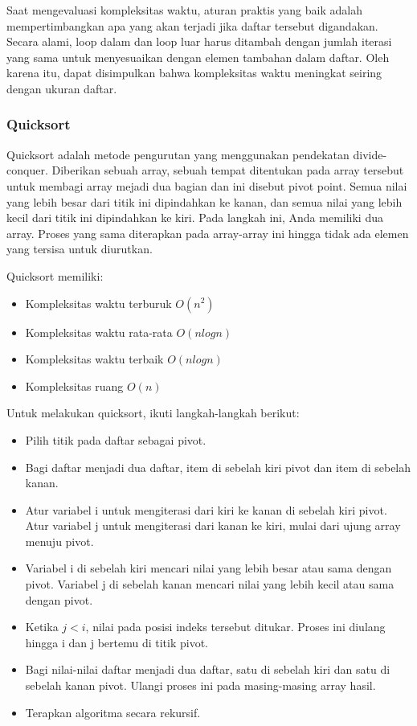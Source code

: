 \documentclass{article}
\begin{document}
Saat mengevaluasi kompleksitas waktu, aturan praktis yang baik adalah mempertimbangkan apa yang akan terjadi jika daftar tersebut digandakan. Secara alami, loop dalam dan loop luar harus ditambah dengan jumlah iterasi yang sama untuk menyesuaikan dengan elemen tambahan dalam daftar. Oleh karena itu, dapat disimpulkan bahwa kompleksitas waktu meningkat seiring dengan ukuran daftar.

\subsubsection{Quicksort}
Quicksort adalah metode pengurutan yang menggunakan pendekatan divide-conquer. Diberikan sebuah array, sebuah tempat ditentukan pada array tersebut untuk membagi array mejadi dua bagian dan ini disebut pivot point. Semua nilai yang lebih besar dari titik ini dipindahkan ke kanan, dan semua nilai yang lebih kecil dari titik ini dipindahkan ke kiri. Pada langkah ini, Anda memiliki dua array. Proses yang sama diterapkan pada array-array ini hingga tidak ada elemen yang tersisa untuk diurutkan.

Quicksort memiliki:
\begin{itemize}
    \item Kompleksitas waktu terburuk \(O(n^2)\)
    \item Kompleksitas waktu rata-rata \(O(n log n)\)
    \item Kompleksitas waktu terbaik \(O(n log n)\)
    \item Kompleksitas ruang \(O(n)\)
\end{itemize}

Untuk melakukan quicksort, ikuti langkah-langkah berikut:
\begin{itemize}
    \item Pilih titik pada daftar sebagai pivot.
    \item Bagi daftar menjadi dua daftar, item di sebelah kiri pivot dan item di sebelah kanan.
    \item Atur variabel i untuk mengiterasi dari kiri ke kanan di sebelah kiri pivot. Atur variabel j untuk mengiterasi dari kanan ke kiri, mulai dari ujung array menuju pivot.
    \item Variabel i di sebelah kiri mencari nilai yang lebih besar atau sama dengan pivot. Variabel j di sebelah kanan mencari nilai yang lebih kecil atau sama dengan pivot.
    \item Ketika \(j < i\), nilai pada posisi indeks tersebut ditukar. Proses ini diulang hingga i dan j bertemu di titik pivot.
    \item Bagi nilai-nilai daftar menjadi dua daftar, satu di sebelah kiri dan satu di sebelah kanan pivot. Ulangi proses ini pada masing-masing array hasil.
    \item Terapkan algoritma secara rekursif.
\end{itemize}
\end{document}
